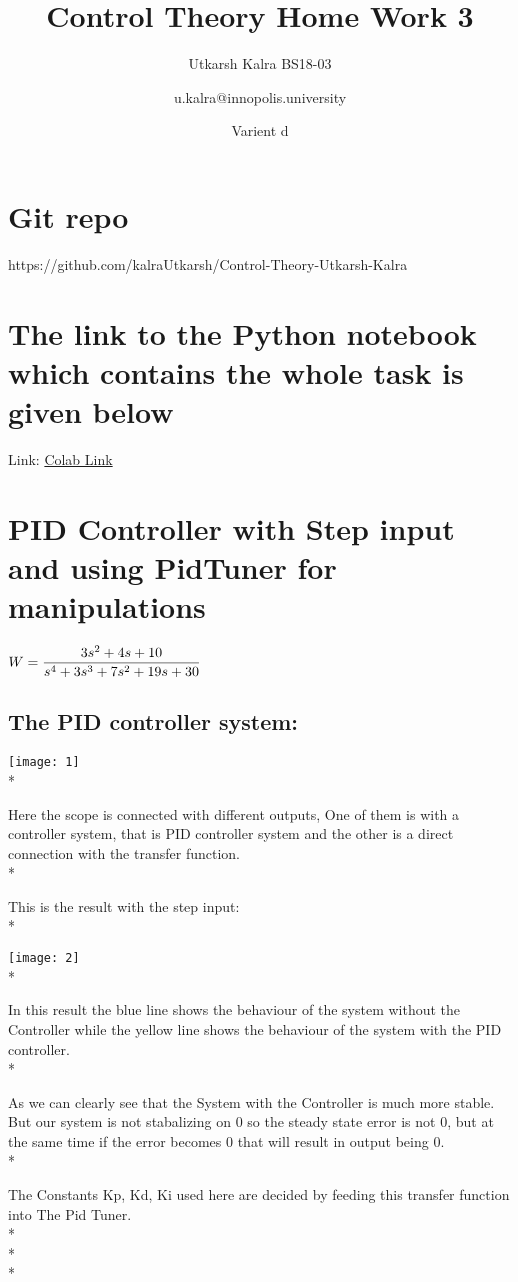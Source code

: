 \documentclass{article}
\title{Control Theory Home Work 3}
\author{Utkarsh Kalra BS18-03 \and u.kalra@innopolis.university }
\date{Varient d}
\begin{document}
\maketitle

\section{Git repo}
https://github.com/kalraUtkarsh/Control-Theory-Utkarsh-Kalra


\section{The link to the Python notebook which contains the whole task is given below}
Link: \href{https://colab.research.google.com/drive/1q4YWi7-Kfk7zRirBQiWTubpDGOPJ317S}{Colab Link} 
\section{PID Controller with Step input and using PidTuner for manipulations}
$
W = {\displaystyle\frac{3s^2+4s+10}{s^4+3s^3+7s^2+19s+30}}\\*
$
\subsection{The PID controller system:}
\texttt{[image: 1]}\\*

Here the scope is connected with different outputs, One of them is with a controller system, that is PID controller system and the other is a direct connection with the transfer function.\\*

This is the result with the step input:\\*

\texttt{[image: 2]}\\*

In this result the blue line shows the behaviour of the system without the Controller while the yellow line shows the behaviour of the system with the PID controller.\\*

As we can clearly see that the System with the Controller is much more stable. But our system is not stabalizing on 0 so the steady state error is not 0, but at the same time if the error becomes 0 that will result in output being 0.\\*

The Constants Kp, Kd, Ki used here are decided by feeding this transfer function into The Pid Tuner.\\*\\*\\*
\end{document}
